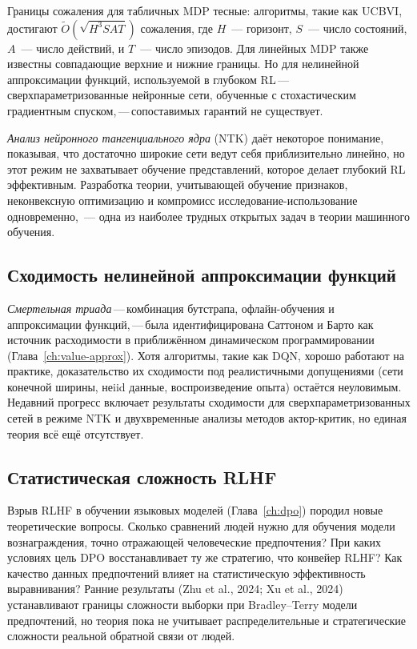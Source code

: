 Границы сожаления для табличных MDP тесные: алгоритмы, такие как UCBVI,
достигают $\tilde{O}(\sqrt{H^3 S A T})$ сожаления, где $H$~---
горизонт, $S$~--- число состояний, $A$~--- число действий, и $T$~---
число эпизодов. Для линейных MDP также известны совпадающие верхние и нижние
границы. Но для нелинейной аппроксимации функций,
используемой в глубоком RL\,---\,сверхпараметризованные нейронные сети, обученные с
стохастическим градиентным спуском,\,---\,сопоставимых гарантий не существует.

\emph{Анализ нейронного тангенциального ядра} (NTK) даёт некоторое понимание,
показывая, что достаточно широкие сети ведут себя приблизительно линейно,
но этот режим не захватывает обучение представлений, которое
делает глубокий RL эффективным. Разработка теории, учитывающей
обучение признаков, неконвексную оптимизацию и компромисс
исследование-использование одновременно,~--- одна из наиболее трудных открытых задач
в теории машинного обучения.

\subsection{Сходимость нелинейной аппроксимации функций}

\emph{Смертельная триада}\,---\,комбинация бутстрапа,
офлайн-обучения и аппроксимации функций,\,---\,была идентифицирована
Саттоном и Барто как источник расходимости в приближённом динамическом
программировании (Глава~\ref{ch:value-approx}). Хотя алгоритмы, такие
как DQN, хорошо работают на практике, доказательство их сходимости под
реалистичными допущениями (сети конечной ширины, неiid данные,
воспроизведение опыта) остаётся неуловимым. Недавний прогресс включает
результаты сходимости для сверхпараметризованных сетей в режиме NTK
и двухвременные анализы методов актор-критик, но единая
теория всё ещё отсутствует.

\subsection{Статистическая сложность RLHF}

Взрыв RLHF в обучении языковых моделей
(Глава~\ref{ch:dpo}) породил новые теоретические вопросы. Сколько
сравнений людей нужно для обучения модели вознаграждения, точно
отражающей человеческие предпочтения? При каких условиях цель DPO восстанавливает ту же стратегию, что конвейер RLHF? Как
качество данных предпочтений влияет на статистическую
эффективность выравнивания? Ранние результаты (Zhu et al., 2024; Xu et al.,
2024) устанавливают границы сложности выборки при
Bradley--Terry модели предпочтений, но
теория пока не учитывает распределительные и стратегические
сложности реальной обратной связи от людей.

